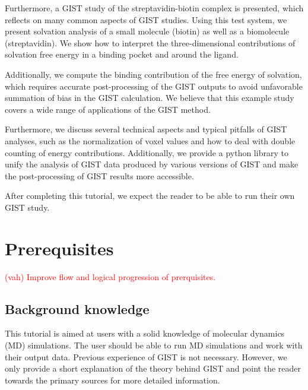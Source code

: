 \documentclass[9pt,tutorial]{livecoms}
\newcommand{\todo}{\textcolor{red}}
\begin{document}
Furthermore, a GIST study of the streptavidin-biotin complex is presented, which reflects on many common aspects of GIST studies.
Using this test system, we present solvation analysis of a small molecule (biotin) as well as a biomolecule (streptavidin).
We show how to interpret the three-dimensional contributions of solvation free energy in a binding pocket and around the ligand.

Additionally, we compute the binding contribution of the free energy of solvation, which requires accurate post-processing of the GIST outputs to avoid unfavorable summation of bias in the GIST calculation.
We believe that this example study covers a wide range of applications of the GIST method.

Furthermore, we discuss several technical aspects  and typical pitfalls of GIST analyses, such as the normalization of voxel values and how to deal with double counting of energy contributions. 
Additionally, we provide a python library to unify the analysis of GIST data produced by various versions of GIST and make the post-processing of GIST results more accessible.

After completing this tutorial, we expect the reader to be able to run their own GIST study. 

%

\section{Prerequisites}
\todo{ (vah)  Improve flow and logical progression of prerquisites.}


\subsection{Background knowledge}
This tutorial is aimed at users with a solid knowledge of molecular dynamics (MD) simulations.
The user should be able to run MD simulations and work with their output data.
Previous experience of GIST is not necessary.
However, we only provide a short explanation of the theory behind GIST and point the reader towards the primary sources for more detailed information.
\end{document}
